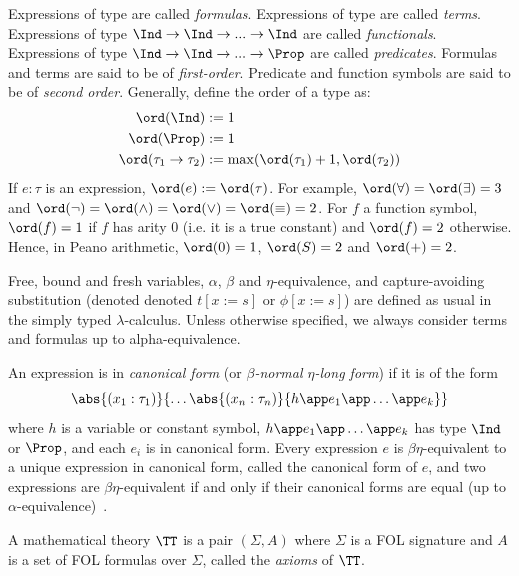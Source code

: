 \begin{definition}
Expressions of type \Prop are called \textit{formulas}. Expressions of type \Ind are called \textit{terms}.
Expressions of type $\Ind \rightarrow \Ind \rightarrow ... \rightarrow \Ind$ are called \textit{functionals}.
Expressions of type $\Ind \rightarrow \Ind \rightarrow ... \rightarrow \Prop$ are called \textit{predicates}.
Formulas and terms are said to be of \textit{first-order}. Predicate and function symbols are said to be of \textit{second order}. Generally, define the order of a type as:
\begin{align*}
    \ord(\Ind) & := 1 \\
    \ord(\Prop) & := 1 \\
    \ord(\tau_1 \to \tau_2) & := \max(\ord(\tau_1)+1, \ord(\tau_2))
\end{align*}
If $e:\tau$ is an expression, $\ord(e) := \ord(\tau)$. For example, $\ord(\forall) = \ord(\exists) = 3$ and $\ord(\neg) = \ord(\land) = \ord(\lor) = \ord(\equiv) = 2$. For $f$ a function symbol, $\ord(f) = 1$ if $f$ has arity 0 (i.e. it is a true constant) and $\ord(f) = 2$ otherwise. Hence, in Peano arithmetic, $\ord(0) = 1$, $\ord(S) = 2$ and $\ord(+) = 2$.
\end{definition}

Free, bound and fresh variables, $\alpha$, $\beta$ and $\eta$-equivalence, and capture-avoiding substitution (denoted denoted $t[x := s]$ or $\phi[x := s]$) are defined as usual in the simply typed $\lambda$-calculus. Unless otherwise specified, we always consider terms and formulas up to alpha-equivalence.

\begin{definition}
  An expression is in \textit{canonical form} (or \textit{$\beta$-normal $\eta$-long form}) if it is of the form
  \[ \abs{(x_1: \tau_1)}{\ldots \abs{(x_n: \tau_n)}{h\app e_1\app \ldots\app e_k}} \] where $h$ is a variable or constant symbol, $h\app e_1\app \ldots\app e_k$ has type $\Ind$ or $\Prop$, and each $e_i$ is in canonical form. 
Every expression $e$ is $\beta\eta$-equivalent to a unique expression in canonical form, called the canonical form of $e$, and two expressions are $\beta\eta$-equivalent if and only if their canonical forms are equal (up to $\alpha$-equivalence)~\cite{barendregtLambdaCalculusTypes2013}.
\end{definition}



\begin{definition}
  A mathematical theory $\TT$ is a pair $(\Sigma, A)$ where $\Sigma$ is a FOL signature and $A$ is a set of FOL formulas over $\Sigma$, called the \textit{axioms} of $\TT$.
\end{definition}

